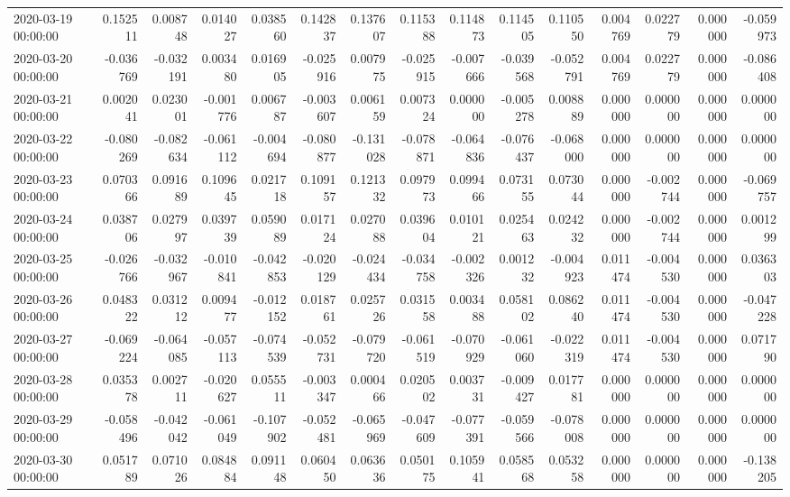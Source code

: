 \begin{tabular}{lrrrrrrrrrrrrrr}
2020-03-19 00:00:00 & 0.152511 & 0.008748 & 0.014027 & 0.038560 & 0.142837 & 0.137607 & 0.115388 & 0.114873 & 0.114505 & 0.110550 & 0.004769 & 0.022779 & 0.000000 & -0.059973 \\
2020-03-20 00:00:00 & -0.036769 & -0.032191 & 0.003480 & 0.016905 & -0.025916 & 0.007975 & -0.025915 & -0.007666 & -0.039568 & -0.052791 & 0.004769 & 0.022779 & 0.000000 & -0.086408 \\
2020-03-21 00:00:00 & 0.002041 & 0.023001 & -0.001776 & 0.006787 & -0.003607 & 0.006159 & 0.007324 & 0.000000 & -0.005278 & 0.008889 & 0.000000 & 0.000000 & 0.000000 & 0.000000 \\
2020-03-22 00:00:00 & -0.080269 & -0.082634 & -0.061112 & -0.004694 & -0.080877 & -0.131028 & -0.078871 & -0.064836 & -0.076437 & -0.068000 & 0.000000 & 0.000000 & 0.000000 & 0.000000 \\
2020-03-23 00:00:00 & 0.070366 & 0.091689 & 0.109645 & 0.021718 & 0.109157 & 0.121332 & 0.097973 & 0.099466 & 0.073155 & 0.073044 & 0.000000 & -0.002744 & 0.000000 & -0.069757 \\
2020-03-24 00:00:00 & 0.038706 & 0.027997 & 0.039739 & 0.059089 & 0.017124 & 0.027088 & 0.039604 & 0.010121 & 0.025463 & 0.024232 & 0.000000 & -0.002744 & 0.000000 & 0.001299 \\
2020-03-25 00:00:00 & -0.026766 & -0.032967 & -0.010841 & -0.042853 & -0.020129 & -0.024434 & -0.034758 & -0.002326 & 0.001232 & -0.004923 & 0.011474 & -0.004530 & 0.000000 & 0.036303 \\
2020-03-26 00:00:00 & 0.048322 & 0.031212 & 0.009477 & -0.012152 & 0.018761 & 0.025726 & 0.031558 & 0.003488 & 0.058102 & 0.086240 & 0.011474 & -0.004530 & 0.000000 & -0.047228 \\
2020-03-27 00:00:00 & -0.069224 & -0.064085 & -0.057113 & -0.074539 & -0.052731 & -0.079720 & -0.061519 & -0.070929 & -0.061060 & -0.022319 & 0.011474 & -0.004530 & 0.000000 & 0.071790 \\
2020-03-28 00:00:00 & 0.035378 & 0.002711 & -0.020627 & 0.055511 & -0.003347 & 0.000466 & 0.020502 & 0.003731 & -0.009427 & 0.017781 & 0.000000 & 0.000000 & 0.000000 & 0.000000 \\
2020-03-29 00:00:00 & -0.058496 & -0.042042 & -0.061049 & -0.107902 & -0.052481 & -0.065969 & -0.047609 & -0.077391 & -0.059566 & -0.078008 & 0.000000 & 0.000000 & 0.000000 & 0.000000 \\
2020-03-30 00:00:00 & 0.051789 & 0.071026 & 0.084884 & 0.091148 & 0.060450 & 0.063636 & 0.050175 & 0.105941 & 0.058568 & 0.053258 & 0.000000 & 0.000000 & 0.000000 & -0.138205 \\

\end{tabular}

